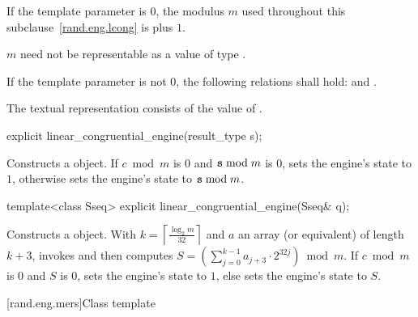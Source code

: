 \pnum
If the template parameter
 is $0$,
the modulus $m$
used throughout this subclause~\ref{rand.eng.lcong}
is  plus $1$.
\begin{note}
 $m$ need not be representable
 as a value of type .
\end{note}

\pnum
If the template parameter
 is not $0$,
the following relations shall hold:
and
  .

\pnum The textual representation%
consists of
the value of .

%
\begin{itemdecl}
explicit linear_congruential_engine(result_type s);
\end{itemdecl}

\begin{itemdescr}
\pnum\effects Constructs a  object.
 If $c \bmod m$ is $0$ and $\texttt{s} \bmod m$ is $0$,
 sets the engine's state to $1$,
 otherwise sets the engine's state to $\texttt{s} \bmod m$.
\end{itemdescr}

%
\begin{itemdecl}
template<class Sseq> explicit linear_congruential_engine(Sseq& q);
\end{itemdecl}

\begin{itemdescr}
\pnum\effects Constructs a  object.
 With
 $k = \left\lceil \frac{\log_2 m}{32} \right\rceil$
 and $a$ an array (or equivalent)
 of length $k + 3$,
 invokes 
 and then computes
 $S = \left(\sum_{j = 0}^{k - 1} a_{j + 3} \cdot 2^{32j} \right) \bmod m$.
 If $c \bmod m$ is $0$ and $S$ is $0$,
 sets the engine's state to $1$,
 else sets the engine's state
 to $S$.
\end{itemdescr}


[rand.eng.mers]{Class template }%
%

